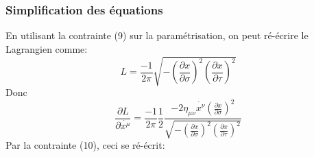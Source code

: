 \documentclass[a4paper,12pt]{article}
\begin{document}
\subsubsection{Simplification des équations}
En utilisant la contrainte (9) sur la paramétrisation, on peut ré-écrire le Lagrangien comme:
$$L=\frac{-1}{2\pi}\sqrt{ -\left( \frac{\partial x}{\partial \sigma}\right) ^{2}\left( \frac{\partial x}{\partial \tau}\right) ^{2} }$$
Donc 
$$\frac{\partial L}{\partial \dot{x^{\mu}}}=\frac{-1}{2\pi}\frac{1}{2}\frac{-2\eta_{\mu\nu}\dot{x^{\nu}}\left( \frac{\partial x}{\partial \sigma}\right) ^{2}}{\sqrt{ -\left( \frac{\partial x}{\partial \sigma}\right) ^{2}\left( \frac{\partial x}{\partial \tau}\right) ^{2} }}$$
Par la contrainte (10), ceci se ré-écrit:
\end{document}
